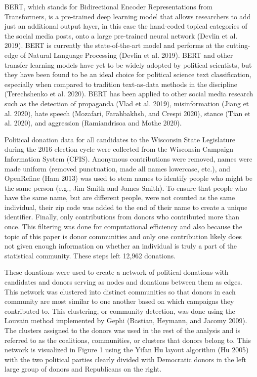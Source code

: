 \documentclass[12pt,]{article}
\begin{document}
BERT, which stands for Bidirectional Encoder Representations from
Transformers, is a pre-trained deep learning model that allows
researchers to add just an additional output layer, in this case the
hand-coded topical categories of the social media posts, onto a large
pre-trained neural network (Devlin et al. 2019). BERT is currently the
state-of-the-art model and performs at the cutting-edge of Natural
Language Processing (Devlin et al. 2019). BERT and other transfer
learning models have yet to be widely adopted by political scientists,
but they have been found to be an ideal choice for political science
text classification, especially when compared to tradition text-as-data
methods in the discipline (Terechshenko et al. 2020). BERT has been
applied to other social media research such as the detection of
propaganda (Vlad et al. 2019), misinformation (Jiang et al. 2020), hate
speech (Mozafari, Farahbakhsh, and Crespi 2020), stance (Tian et al.
2020), and aggression (Ramiandrisoa and Mothe 2020).

Political donation data for all candidates to the Wisconsin State
Legislature during the 2016 election cycle were collected from the
Wisconsin Campaign Information System (CFIS). Anonymous contributions
were removed, names were made uniform (removed punctuation, made all
names lowercase, etc.), and OpenRefine (Ham 2013) was used to stem names
to identify people who might be the same person (e.g., Jim Smith and
James Smith). To ensure that people who have the same name, but are
different people, were not counted as the same individual, their zip
code was added to the end of their name to create a unique identifier.
Finally, only contributions from donors who contributed more than once.
This filtering was done for computational efficiency and also because
the topic of this paper is donor communities and only one contribution
likely does not given enough information on whether an individual is
truly a part of the statistical community. These steps left 12,962
donations.

These donations were used to create a network of political donations
with candidates and donors serving as nodes and donations between them
as edges. This network was clustered into distinct communities so that
donors in each community are most similar to one another based on which
campaigns they contributed to. This clustering, or community detection,
was done using the Louvain method implemented by Gephi (Bastian,
Heymann, and Jacomy 2009). The clusters assigned to the donors was used
in the rest of the analysis and is referred to as the coalitions,
communities, or clusters that donors belong to. This network is
visualized in Figure 1 using the Yifan Hu layout algorithm (Hu 2005)
with the two political parties clearly divided with Democratic donors in
the left large group of donors and Republicans on the right.
\end{document}
